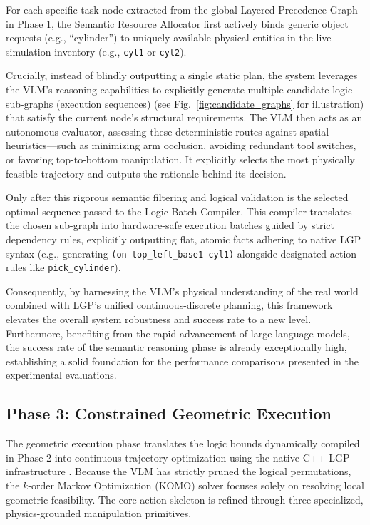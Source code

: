 \documentclass[journal]{IEEEtran}
\begin{document}
  For each specific task node extracted from the global Layered Precedence Graph
  in Phase 1, the Semantic Resource Allocator first actively binds generic object
  requests (e.g., ``cylinder'') to uniquely available physical entities in the live
  simulation inventory (e.g., \texttt{cyl1} or \texttt{cyl2}).

  Crucially, instead of blindly outputting a single static plan, the system leverages
  the VLM's reasoning capabilities to explicitly generate multiple candidate logic
  sub-graphs (execution sequences) (see Fig.~\ref{fig:candidate_graphs} for illustration)
  that satisfy the current node's structural requirements. The VLM then acts as an
  autonomous evaluator, assessing these deterministic routes against spatial
  heuristics---such as minimizing arm occlusion, avoiding redundant tool switches,
  or favoring top-to-bottom manipulation. It explicitly selects the most physically
  feasible trajectory and outputs the rationale behind its decision.

  Only after this rigorous semantic filtering and logical validation is the selected
  optimal sequence passed to the Logic Batch Compiler. This compiler translates
  the chosen sub-graph into hardware-safe execution batches guided by strict
  dependency rules, explicitly outputting flat, atomic facts adhering to native
  LGP syntax (e.g., generating \texttt{(on top\_left\_base1 cyl1)} alongside
  designated action rules like \texttt{pick\_cylinder}).

  Consequently, by harnessing the VLM's physical understanding of the real world
  combined with LGP's unified continuous-discrete planning, this framework
  elevates the overall system robustness and success rate to a new level. Furthermore,
  benefiting from the rapid advancement of large language models, the success rate
  of the semantic reasoning phase is already exceptionally high, establishing a
  solid foundation for the performance comparisons presented in the experimental
  evaluations.

  \subsection{Phase 3: Constrained Geometric Execution}
  \label{subsec:phase3}

  The geometric execution phase translates the logic bounds dynamically compiled
  in Phase 2 into continuous trajectory optimization using the native C++ LGP infrastructure
  \cite{cite_lgp_2015}. Because the VLM has strictly pruned the logical
  permutations, the $k$-order Markov Optimization (KOMO) solver focuses solely on
  resolving local geometric feasibility. The core action skeleton is refined
  through three specialized, physics-grounded manipulation primitives.
\end{document}

